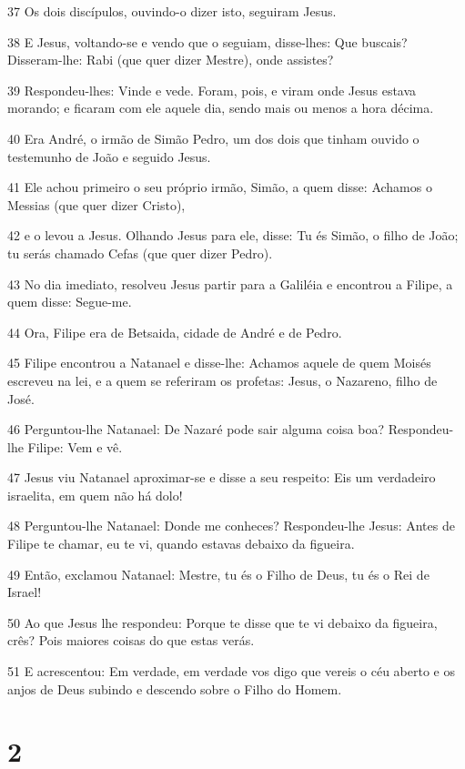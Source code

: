 \par 37 Os dois discípulos, ouvindo-o dizer isto, seguiram Jesus.
\par 38 E Jesus, voltando-se e vendo que o seguiam, disse-lhes: Que buscais? Disseram-lhe: Rabi (que quer dizer Mestre), onde assistes?
\par 39 Respondeu-lhes: Vinde e vede. Foram, pois, e viram onde Jesus estava morando; e ficaram com ele aquele dia, sendo mais ou menos a hora décima.
\par 40 Era André, o irmão de Simão Pedro, um dos dois que tinham ouvido o testemunho de João e seguido Jesus.
\par 41 Ele achou primeiro o seu próprio irmão, Simão, a quem disse: Achamos o Messias (que quer dizer Cristo),
\par 42 e o levou a Jesus. Olhando Jesus para ele, disse: Tu és Simão, o filho de João; tu serás chamado Cefas (que quer dizer Pedro).
\par 43 No dia imediato, resolveu Jesus partir para a Galiléia e encontrou a Filipe, a quem disse: Segue-me.
\par 44 Ora, Filipe era de Betsaida, cidade de André e de Pedro.
\par 45 Filipe encontrou a Natanael e disse-lhe: Achamos aquele de quem Moisés escreveu na lei, e a quem se referiram os profetas: Jesus, o Nazareno, filho de José.
\par 46 Perguntou-lhe Natanael: De Nazaré pode sair alguma coisa boa? Respondeu-lhe Filipe: Vem e vê.
\par 47 Jesus viu Natanael aproximar-se e disse a seu respeito: Eis um verdadeiro israelita, em quem não há dolo!
\par 48 Perguntou-lhe Natanael: Donde me conheces? Respondeu-lhe Jesus: Antes de Filipe te chamar, eu te vi, quando estavas debaixo da figueira.
\par 49 Então, exclamou Natanael: Mestre, tu és o Filho de Deus, tu és o Rei de Israel!
\par 50 Ao que Jesus lhe respondeu: Porque te disse que te vi debaixo da figueira, crês? Pois maiores coisas do que estas verás.
\par 51 E acrescentou: Em verdade, em verdade vos digo que vereis o céu aberto e os anjos de Deus subindo e descendo sobre o Filho do Homem.

\chapter{2}

